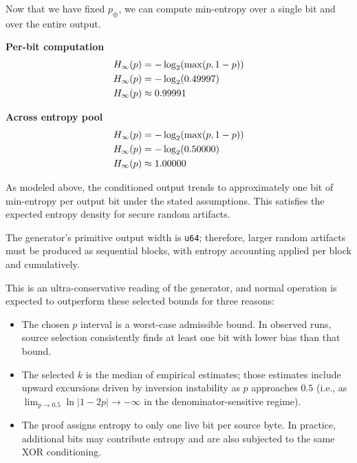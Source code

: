 \documentclass[titlepage]{report}
\begin{document}
		Now that we have fixed $p_{\oplus}$, we can compute min-entropy over a single bit and over the entire output.
	\begingroup
	\setlength{\abovedisplayskip}{4pt}
	\setlength{\abovedisplayshortskip}{4pt}
	\setlength{\belowdisplayskip}{4pt}
	\setlength{\belowdisplayshortskip}{4pt}
	\vspace{-0.35em}
	\begin{center}
		\begin{minipage}[t]{0.48\textwidth}
			\vspace{0pt}
			\textbf{Per-bit computation}
			\begin{align*}
				H_{\infty}(p)&=-\log_2\!\left(\max(p,1-p)\right) \\
				H_{\infty}(p)&=-\log_2\!\left(0.49997\right) \\
				H_{\infty}(p)&\approx 0.99991
			\end{align*}
		\end{minipage}\hfill
		\begin{minipage}[t]{0.48\textwidth}
			\vspace{0pt}
			\textbf{Across entropy pool}
			\begin{align*}
				H_{\infty}(p)&=-\log_2\!\left(\max(p,1-p)\right) \\
				H_{\infty}(p)&=-\log_2\!\left(0.50000\right) \\
				H_{\infty}(p)&\approx 1.00000
			\end{align*}
		\end{minipage}
	\end{center}
	\vspace{-0.35em}
	\endgroup
	
	As modeled above, the conditioned output trends to approximately one bit of min-entropy per output bit under the stated assumptions. This satisfies the expected entropy density for secure random artifacts.
	
	The generator’s primitive output width is \texttt{u64}; therefore, larger random artifacts must be produced as sequential blocks, with entropy accounting applied per block and cumulatively.
	
	This is an ultra-conservative reading of the generator, and normal operation is expected to outperform these selected bounds for three reasons:
	\begin{itemize}
		\item The chosen $p$ interval is a worst-case admissible bound. In observed runs, source selection consistently finds at least one bit with lower bias than that bound.
		\item The selected $k$ is the median of empirical estimates; those estimates include upward excursions driven by inversion instability as $p$ approaches $0.5$ (i.e., as $\lim_{p\to0.5}\ln|1-2p|\to-\infty$ in the denominator-sensitive regime).
		\item The proof assigns entropy to only one live bit per source byte. In practice, additional bits may contribute entropy and are also subjected to the same XOR conditioning.
	\end{itemize}
	
\end{document}
